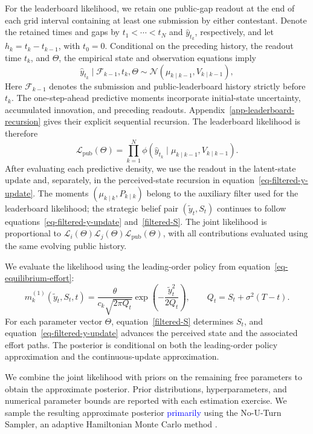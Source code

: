 \documentclass[mnsc]{informs3}
\begin{document}
For the leaderboard likelihood, we retain one public-gap readout at the end of each grid interval containing at least one submission by either contestant. Denote the retained times and gaps by $t_1<\cdots<t_N$ and $\hat y_{t_k}$, respectively, and let $h_k=t_k-t_{k-1}$, with $t_0=0$. Conditional on the preceding history, the readout time $t_k$, and $\Theta$, the empirical state and observation equations imply
\[
{\hat y_{t_k}\mid\mathcal F_{k-1},t_k,\Theta}
\sim
\mathcal N\!\left(\mu_{k\mid k-1},V_{k\mid k-1}\right),
\]
{Here $\mathcal F_{k-1}$ denotes the submission and public-leaderboard history strictly before $t_k$. The one-step-ahead predictive moments incorporate initial-state uncertainty, accumulated innovation, and preceding readouts. Appendix~\ref{app-leaderboard-recursion} gives their explicit sequential recursion. The leaderboard likelihood is therefore}
\begin{equation}\label{eq-obs_gap-prob}
{\mathcal L_{\mathrm{pub}}(\Theta)}
=
\prod_{k=1}^N
\phi\left(\hat y_{t_k}\mid\mu_{k\mid k-1},V_{k\mid k-1}\right).
\end{equation}
{After evaluating each predictive density, we use the readout in the latent-state update and, separately, in the perceived-state recursion in equation~\eqref{eq-filtered-y-update}. The moments $(\mu_{k\mid k},P_{k\mid k})$ belong to the auxiliary filter used for the leaderboard likelihood; the strategic belief pair $(\tilde y_t,S_t)$ continues to follow equations~\eqref{eq-filtered-y-update} and~\eqref{filtered-S}. The joint likelihood is proportional to $\mathcal L_i(\Theta)\mathcal L_j(\Theta)\mathcal L_{\mathrm{pub}}(\Theta)$, with all contributions evaluated using the same evolving public history.}

{We evaluate the likelihood using the leading-order policy from equation~\eqref{eq-equilibrium-effort}:}
\begin{equation}\label{eq-empirical-leading-effort}
{m_k^{(1)}(\tilde y_t,S_t,t)
=\frac{\theta}{c_k\sqrt{2\pi Q_t}}
\exp\!\left(-\frac{\tilde y_t^2}{2Q_t}\right),
\qquad Q_t=S_t+\sigma^2(T-t).}
\end{equation}
{For each parameter vector $\Theta$, equation~\eqref{filtered-S} determines $S_t$, and equation~\eqref{eq-filtered-y-update} advances the perceived state and the associated effort paths. The posterior is conditional on both the leading-order policy approximation and the continuous-update approximation.}

We combine the joint likelihood with priors on the remaining free parameters to obtain the approximate posterior. Prior distributions, hyperparameters, and numerical parameter bounds are reported with each estimation exercise.
We sample the resulting approximate posterior \textcolor{blue}{primarily} using the No-U-Turn Sampler, an adaptive Hamiltonian Monte Carlo method \citep{hoffman2014NUTS}.
\end{document}
